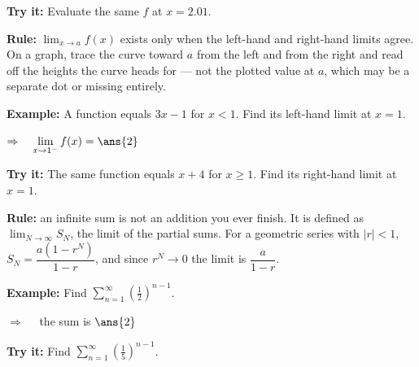 \documentclass[12pt]{article}
\begin{document}
\begin{tryitbox}
\textbf{Try it:} \quad Evaluate the same $f$ at $x = 2.01$.\\[2pt]
\end{tryitbox}


\begin{formulabox}
\textbf{Rule:} $\displaystyle\lim_{x \to a} f(x)$ exists only when the left-hand and right-hand
limits agree. On a graph, trace the curve toward $a$ from the left and from the right and read
off the heights the curve heads for --- not the plotted value at $a$, which may be a separate
dot or missing entirely.
\end{formulabox}

\begin{examplebox}
\textbf{Example:} \quad A function equals $3x - 1$ for $x < 1$. Find its left-hand limit at $x = 1$.

$\Rightarrow\quad \displaystyle\lim_{x \to 1^-} f(x) = \ans{2}$
\end{examplebox}

\begin{tryitbox}
\textbf{Try it:} \quad The same function equals $x + 4$ for $x \ge 1$. Find its right-hand limit at $x = 1$.\\[2pt]
\end{tryitbox}


\begin{formulabox}
\textbf{Rule:} an infinite sum is not an addition you ever finish. It is defined as
$\displaystyle\lim_{N \to \infty} S_N$, the limit of the partial sums. For a geometric series
with $|r| < 1$, $S_N = \dfrac{a(1 - r^{N})}{1 - r}$, and since $r^{N} \to 0$ the limit is
$\dfrac{a}{1 - r}$.
\end{formulabox}

\begin{examplebox}
\textbf{Example:} \quad Find $\displaystyle\sum_{n=1}^{\infty}\left(\tfrac{1}{2}\right)^{n-1}$.

$\Rightarrow\quad$ the sum is $\ans{2}$
\end{examplebox}

\begin{tryitbox}
\textbf{Try it:} \quad Find $\displaystyle\sum_{n=1}^{\infty}\left(\tfrac{1}{5}\right)^{n-1}$.\\[2pt]
\end{tryitbox}
\end{document}

